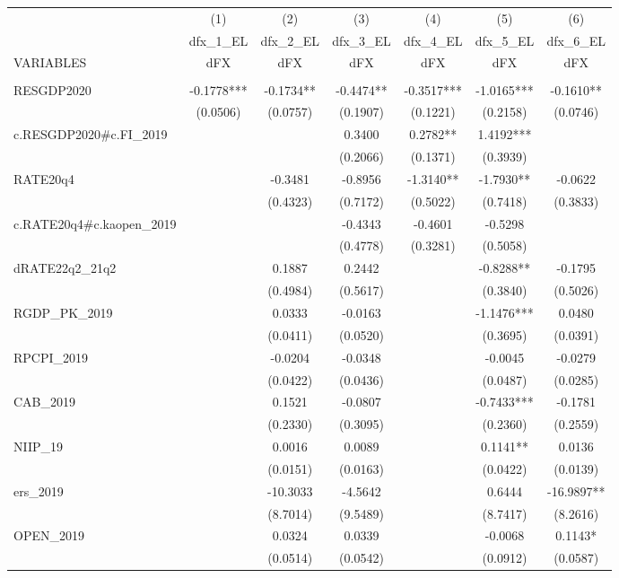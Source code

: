 \documentclass[]{article}
\begin{document}
\begin{tabular}{lcccccc} \hline
 & (1) & (2) & (3) & (4) & (5) & (6) \\
 & dfx\_1\_EL & dfx\_2\_EL & dfx\_3\_EL & dfx\_4\_EL & dfx\_5\_EL & dfx\_6\_EL \\
VARIABLES & dFX & dFX & dFX & dFX & dFX & dFX \\ \hline
 &  &  &  &  &  &  \\
RESGDP2020 & -0.1778*** & -0.1734** & -0.4474** & -0.3517*** & -1.0165*** & -0.1610** \\
 & (0.0506) & (0.0757) & (0.1907) & (0.1221) & (0.2158) & (0.0746) \\
c.RESGDP2020\#c.FI\_2019 &  &  & 0.3400 & 0.2782** & 1.4192*** &  \\
 &  &  & (0.2066) & (0.1371) & (0.3939) &  \\
RATE20q4 &  & -0.3481 & -0.8956 & -1.3140** & -1.7930** & -0.0622 \\
 &  & (0.4323) & (0.7172) & (0.5022) & (0.7418) & (0.3833) \\
c.RATE20q4\#c.kaopen\_2019 &  &  & -0.4343 & -0.4601 & -0.5298 &  \\
 &  &  & (0.4778) & (0.3281) & (0.5058) &  \\
dRATE22q2\_21q2 &  & 0.1887 & 0.2442 &  & -0.8288** & -0.1795 \\
 &  & (0.4984) & (0.5617) &  & (0.3840) & (0.5026) \\
RGDP\_PK\_2019 &  & 0.0333 & -0.0163 &  & -1.1476*** & 0.0480 \\
 &  & (0.0411) & (0.0520) &  & (0.3695) & (0.0391) \\
RPCPI\_2019 &  & -0.0204 & -0.0348 &  & -0.0045 & -0.0279 \\
 &  & (0.0422) & (0.0436) &  & (0.0487) & (0.0285) \\
CAB\_2019 &  & 0.1521 & -0.0807 &  & -0.7433*** & -0.1781 \\
 &  & (0.2330) & (0.3095) &  & (0.2360) & (0.2559) \\
NIIP\_19 &  & 0.0016 & 0.0089 &  & 0.1141** & 0.0136 \\
 &  & (0.0151) & (0.0163) &  & (0.0422) & (0.0139) \\
ers\_2019 &  & -10.3033 & -4.5642 &  & 0.6444 & -16.9897** \\
 &  & (8.7014) & (9.5489) &  & (8.7417) & (8.2616) \\
OPEN\_2019 &  & 0.0324 & 0.0339 &  & -0.0068 & 0.1143* \\
 &  & (0.0514) & (0.0542) &  & (0.0912) & (0.0587) \\

\end{tabular}
\end{document}
